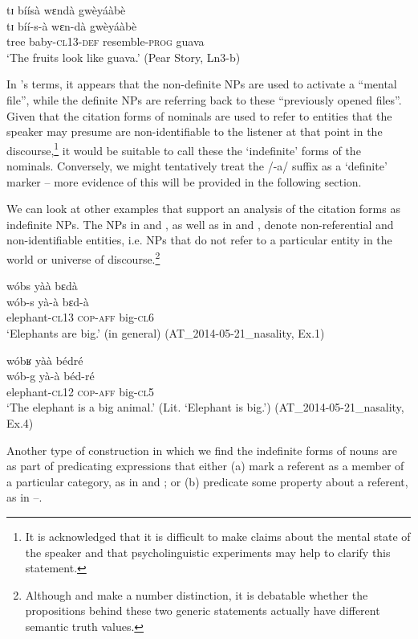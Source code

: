 \documentclass[output=paper]{langsci/langscibook}
\begin{document}
\ea\label{ex:teo:31}
 tɪ bíísà wɛndà gwèyáàbè\\
\gll tɪ bíí-s-à wɛn-dà gwèyáàbè\\
 tree baby-\textsc{cl13-}\textsc{def} resemble-\textsc{prog} guava\\
\glt ‘The fruits look like guava.’ (Pear Story, Ln3-b)
\z

In \cite{DuBois1980}’s terms, it appears that the non-definite NPs are used to activate a “mental file”, while the definite NPs are referring back to these “previously opened files”. Given that the citation forms of nominals are used to refer to entities that the speaker may presume are non-identifiable to the listener at that point in the discourse,\footnote{It is acknowledged that it is difficult to make claims about the mental state of the speaker and that psycholinguistic experiments may help to clarify this statement.} it would be suitable to call these the ‘indefinite’ forms of the nominals. Conversely, we might tentatively treat the /-a/ suffix as a ‘definite’ marker – more evidence of this will be provided in the following section.

We can look at other examples that support an analysis of the citation forms as indefinite NPs. The NPs in  and , as well as in  and , denote non-referential and non-identifiable entities, i.e. NPs that do not refer to a particular entity in the world or universe of discourse.\footnote{Although  and  make a number distinction, it is debatable whether the propositions behind these two generic statements actually have different semantic truth values.}

\ea\label{ex:teo:32}

wóbs yàà bɛdà\\
\gll wób-s yà-à bɛd-à\\
 elephant-\textsc{cl13} \textsc{cop-aff} big-\textsc{cl6}\\
\glt ‘Elephants are big.’ (in general) (AT\_2014-05-21\_nasality, Ex.1)
\z

\ea\label{ex:teo:33}

wóbʁ yàà bédré\\
\gll wób-g yà-à béd-ré\\
elephant-\textsc{cl12} \textsc{cop-aff} big-\textsc{cl5}\\
\glt ‘The elephant is a big animal.’ (Lit. ‘Elephant is big.’) (AT\_2014-05-21\_nasality, Ex.4)
\z

Another type of construction in which we find the indefinite forms of nouns are as part of predicating expressions that either (a) mark a referent as a member of a particular category, as in  and ; or (b) predicate some property about a referent, as in –.
\end{document}
